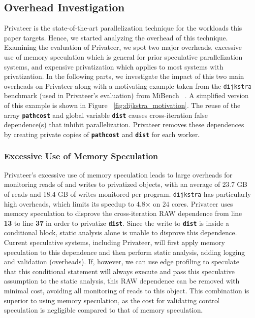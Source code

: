\subsection{Overhead Investigation}
Privateer is the state-of-the-art parallelization technique for the
workloads this paper targets. Hence, we started analyzing the overhead of
this technique.
%
Examining the evaluation of Privateer, we spot two major overheads,
excessive use of memory speculation which is general for prior speculative
parallelization systems, and expensive privatization which applies to
most systems with privatization.
%
In the following parts, we investigate the impact of this two main
overheads on Privateer along with a motivating example taken from the
\texttt{dijkstra} benchmark (used in Privateer's evaluation) from MiBench
~\cite{}. A simplified version of this example is shown in Figure
~\ref{fig:dijkstra_motivation}. The reuse of the array
\texttt{\textbf{pathcost}} and global variable \texttt{\textbf{dist}}
causes cross-iteration false dependence(s) that inhibit parallelization.
Privateer removes these dependences by creating private copies of
\texttt{\textbf{pathcost}} and \texttt{\textbf{dist}} for each worker.

\subsubsection{Excessive Use of Memory Speculation}
Privateer's excessive use of memory speculation leads to large overheads
for monitoring reads of and writes to privatized objects, with an average
of 23.7 GB of reads and 18.4 GB of writes monitored per program.
\texttt{dijkstra} has particularly high overheads, which limits its speedup
to 4.8$\times$ on 24 cores.
Privateer uses memory speculation to disprove the cross-iteration RAW
dependence from line \textbf{13} to line \textbf{37} in order to privatize
\texttt{\textbf{dist}}. Since the write to \texttt{\textbf{dist}} is inside
a conditional block, static analysis alone is unable to disprove this
dependence. Current speculative systems, including Privateer, will first
apply memory speculation to this dependence and then perform static analysis,
adding logging and validation (overheads). If, however, we can use edge
profiling to speculate that this conditional statement will always execute
and pass this speculative assumption to the static analysis, this RAW
dependence can be removed with minimal cost, avoiding all monitoring of reads to
this object. This combination is superior to using memory speculation,
as the cost for validating control speculation is negligible compared to
that of memory speculation.

